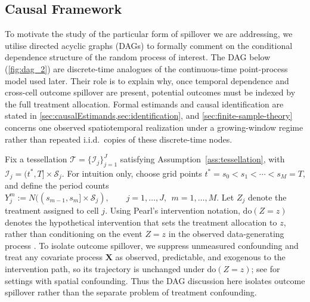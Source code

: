 \documentclass{statsoc}
\newcommand{\1}{\mathbbm{1}}
\newcommand{\CovX}{\mathbf{X}}
\newcommand{\Nproc}{N}
\begin{document}

\subsection{Causal Framework}\label{sec:causal-framework-dag}
To motivate the study of the particular form of spillover we are addressing, we utilise directed acyclic graphs (DAGs) \citep{pearl2009causal} to formally comment on the conditional dependence structure of the random process of interest. The DAG below (\cref{fig:dag_2}) are discrete-time analogues of the continuous-time point-process model used later. Their role is to explain why, once temporal dependence and cross-cell outcome spillover are present, potential outcomes must be indexed by the full treatment allocation. Formal estimands and causal identification are stated in \cref{sec:causalEstimands,sec:identification}, and \cref{sec:finite-sample-theory} concerns one observed spatiotemporal realization under a growing-window regime rather than repeated i.i.d.\ copies of these discrete-time nodes.

Fix a tessellation \(\mathcal T=\{\mathcal I_j\}_{j=1}^J\) satisfying Assumption~\ref{ass:tessellation}, with
\(\mathcal I_j=(t^\ast,T]\times \mathcal S_j\). For intuition only, choose grid points \(t^\ast=s_0<s_1<\cdots<s_M=T\), and define the period counts
\(
Y_j^m:=\Nproc((s_{m-1},s_m]\times \mathcal S_j),
\qquad j=1,\ldots,J,\ \ m=1,\ldots,M.
\)
Let \(Z_j\) denote the treatment assigned to cell \(j\). Using Pearl's intervention notation, $\mathrm{do}(Z=z)$ denotes the hypothetical intervention that sets the treatment allocation to $z$, rather than conditioning on the event $Z=z$ in the observed data-generating process \citep{pearl2009causal}. To isolate outcome spillover, we suppress unmeasured confounding and treat any covariate process \(\CovX\) as observed, predictable, and exogenous to the intervention path, so its trajectory is unchanged under \(\mathrm{do}(Z=z)\); see \citet{papadogeorgou2023spatial} for settings with spatial confounding. %
Thus the DAG discussion here isolates outcome spillover rather than the separate problem of treatment confounding.
\end{document}
